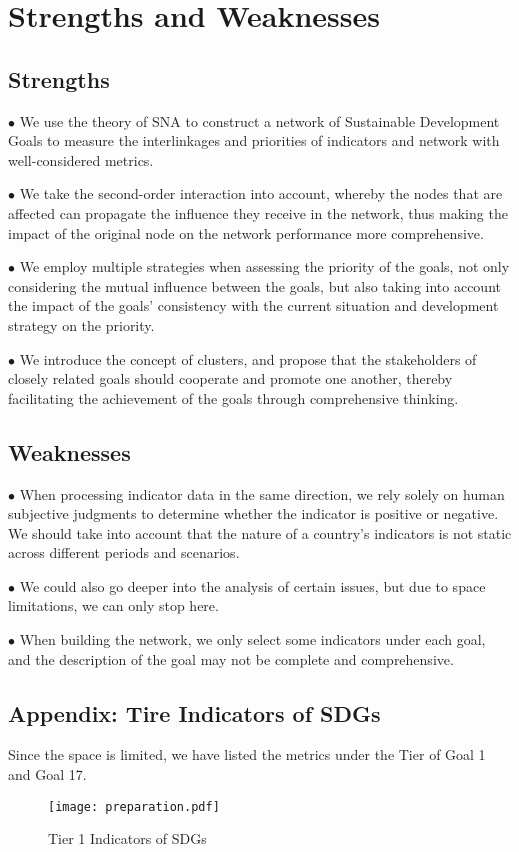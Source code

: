 \documentclass[12pt]{article}  %
\begin{document}
\section{Strengths and Weaknesses}
\subsection{Strengths}
$\bullet$ We use the theory of SNA to construct a network of Sustainable Development Goals
to measure the interlinkages and priorities of indicators and  network with well-considered metrics.

$\bullet$ 
We take the second-order interaction into account, whereby the nodes that are affected can propagate the influence they receive in the network, thus making the impact of the original node on the network performance more comprehensive.

$\bullet$
We employ multiple strategies when assessing the priority of the goals, not only considering the mutual influence between the goals, but also taking into account the impact of the goals' consistency with the current situation and development strategy on the priority.

$\bullet$
We introduce the concept of clusters, and propose that the stakeholders of closely related goals should cooperate and promote one another, thereby facilitating the achievement of the goals through comprehensive thinking.


\subsection{Weaknesses}
$\bullet$ When processing indicator data in the same direction, we rely solely on human subjective judgments to determine whether the indicator is positive or negative. We should take into account that the nature of a country’s indicators is not static across different periods and scenarios.

$\bullet$ We could also go deeper into the analysis of certain issues, but due to space limitations,
we can only stop here.

$\bullet$ When building the network, we only select some indicators under each goal, and the description of the goal may not be complete and comprehensive.


\clearpage

\begin{subappendices}  %

\section{Appendix: Tire Indicators of SDGs}
Since the space is limited, we have listed the metrics under the Tier of Goal 1 and Goal 17.
\begin{figure}[htbp]
\centering
\texttt{[image: preparation.pdf]}
\caption{Tier 1 Indicators of SDGs}
\end{figure}



\end{subappendices}
\end{document}

